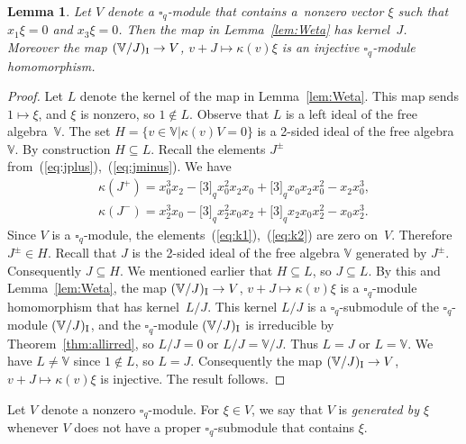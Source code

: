 \documentclass[pdftex]{sigma}
\numberwithin{equation}{section}
\newtheorem{Lemma}[Theorem]{Lemma}
\begin{document}
\begin{Lemma}\label{lem:qSerreW} Let $V$ denote a $\square_q$-module that contains a~nonzero vector $\xi$ such that $x_1 \xi = 0 $ and $x_3 \xi = 0$. Then the map in Lemma~{\rm \ref{lem:Weta}} has kernel~$J$.
Moreover the map $(\mathbb V/J)_{\rm I} \to V$, $v+J \mapsto \kappa(v)\xi$ is an injective $\square_q$-module homomorphism.
\end{Lemma}
\begin{proof}Let $L$ denote the kernel of the map in Lemma~\ref{lem:Weta}. This map sends $1 \mapsto \xi$, and $\xi$ is nonzero, so $1 \not \in L$. Observe that $L$ is a left ideal of the free algebra~$\mathbb V$.
The set $H= \lbrace v \in \mathbb V| \kappa(v)V=0\rbrace$ is a 2-sided ideal of the free algebra~$\mathbb V$. By construction $H \subseteq L$. Recall the elements $J^{\pm}$ from~(\ref{eq:jplus}),~(\ref{eq:jminus}). We have
\begin{gather}
\kappa(J^+) =x^3_0 x_{2} - \lbrack 3 \rbrack_q x^2_0 x_{2} x_0 +\lbrack 3 \rbrack_q x_0 x_{2} x^2_0 -x_{2} x^3_0,\label{eq:k1}\\
\kappa(J^-)=x^3_2 x_{0} - \lbrack 3 \rbrack_q x^2_2 x_{0} x_2 +\lbrack 3 \rbrack_q x_2 x_{0} x^2_2 -x_{0} x^3_2.\label{eq:k2}
\end{gather}
Since $V$ is a $\square_q$-module, the elements~(\ref{eq:k1}),~(\ref{eq:k2}) are zero on~$V$. Therefore
$J^\pm \in H$. Recall that $J$ is the 2-sided ideal of the free algebra $\mathbb V$ generated by $J^{\pm}$. Consequently $J \subseteq H$. We mentioned earlier that $H \subseteq L$, so $J \subseteq L$.
By this and Lemma~\ref{lem:Weta}, the map $(\mathbb V/J)_{\rm I} \to V$, $v+J \mapsto \kappa(v)\xi$
is a $\square_q$-module homomorphism that has kernel~$L/J$. This kernel $L/J$ is a $\square_q$-submodule of the $\square_q$-module $(\mathbb V/J)_{\rm I}$, and the $\square_q$-module $(\mathbb V/J)_{\rm I}$ is irreducible by Theorem~\ref{thm:allirred}, so $L/J=0$ or $L/J=\mathbb V/J$. Thus $L=J$ or $L=\mathbb V$.
We have $L\not=\mathbb V$ since $1 \not\in L$, so $L=J$. Consequently the map $(\mathbb V/J)_{\rm I} \to V$, $v+J \mapsto \kappa(v)\xi$ is injective. The result follows.
\end{proof}

Let $V$ denote a nonzero $\square_q$-module. For $\xi\in V$, we say that $V$ is {\it generated by $\xi$} whenever $V$ does not have a proper $\square_q$-submodule that contains $\xi$.
\end{document}
